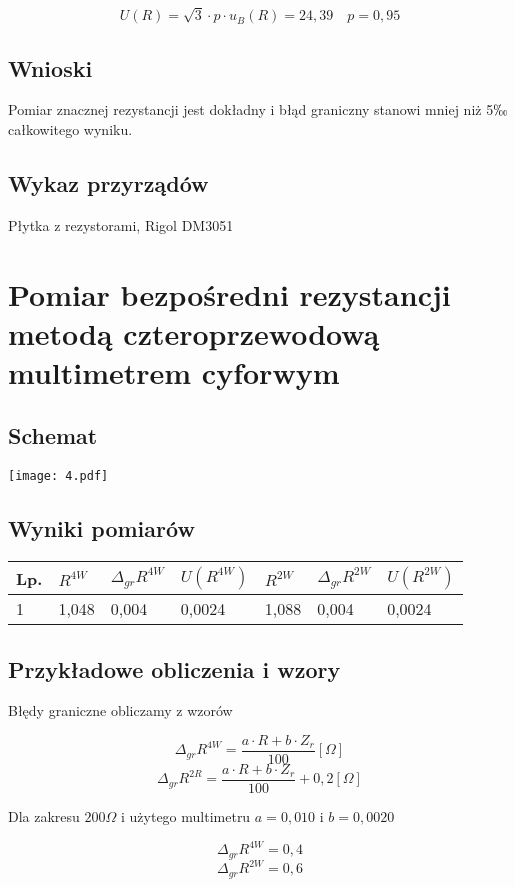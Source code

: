 \documentclass[11pt]{article}
\begin{document}
$$ U(R) = \sqrt{3} \cdot p \cdot u_B(R) = 24,39 \quad p = 0,95$$

\subsection{Wnioski}
Pomiar znacznej rezystancji jest dokładny i błąd graniczny stanowi mniej niż 5$\permil$ całkowitego wyniku. 
\subsection{Wykaz przyrządów}
Płytka z rezystorami, Rigol DM3051

\section{Pomiar bezpośredni rezystancji metodą czteroprzewodową multimetrem cyforwym}

\subsection{Schemat}
\begin{center}
\texttt{[image: 4.pdf]}
\end{center}
\subsection{Wyniki pomiarów}
\begin{center}
\begin{tabular}{|l|l|l|l|l|l|l|}
\hline
	Lp. & $R^{4W}$ & $\Delta_{gr}R^{4W}$ & $U(R^{4W})$ & $R^{2W}$ & $\Delta_{gr}R^{2W}$ & $U(R^{2W})$\\
\hline
	 1 & 1,048 & 0,004 & 0,0024 & 1,088 & 0,004 & 0,0024 \\
\hline
\end{tabular}
\end{center}
\subsection{Przykładowe obliczenia i wzory}
Błędy graniczne obliczamy z wzorów 

$$\Delta_{gr}R^{4W} = \frac{ a \cdot R + b \cdot Z_r}{100} [\Omega]$$ 
$$ \Delta_{gr}R^{2R} = \frac{ a \cdot R + b \cdot Z_r}{100} + 0,2 [\Omega]$$

Dla zakresu $200 \Omega$ i użytego multimetru $a = 0,010$ i $b = 0,0020$

$$ \Delta_{gr}R^{4W} = 0,4 $$
$$ \Delta_{gr}R^{2W} = 0,6 $$
\end{document}
